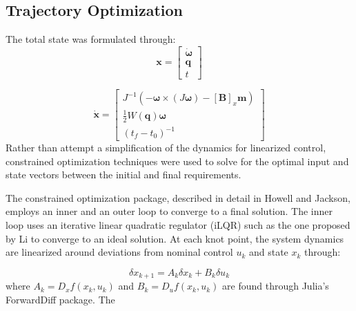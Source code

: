 \documentclass[letterpaper, preprint, paper,11pt]{IAA-AAS}	%
\begin{document}
\subsection{Trajectory Optimization}
The total state was formulated through:
\begin{equation}
	\label{eq:7}
	\mathbf{x} = 
	\begin{bmatrix}
	\mathbf{\dot{\omega}}\\
	\mathbf{q}\\
	t
	\end{bmatrix}
\end{equation}

\begin{equation}
	\label{eq:8}
	\mathbf{\dot{x}} = 
	\begin{bmatrix}
	J^{-1}(-\mathbf{\omega} \times (J\mathbf{\omega})-[\mathbf{B}]_x\mathbf{m})\\
	\frac{1}{2} W(\mathbf{q}) \mathbf{\omega}\\
	(t_f - t_0)^{-1}
	\end{bmatrix}
\end{equation}
Rather than attempt a simplification of the dynamics for linearized control, constrained optimization techniques were used to solve for the optimal input and state vectors between the initial and final requirements. 

The constrained optimization package, described in detail in Howell and Jackson\cite{howell2019}, employs an inner and an outer loop to converge to a final solution. The inner loop uses an iterative linear quadratic regulator (iLQR) such as the one proposed by Li\cite{li2004} to converge to an ideal solution. At each knot point, the system dynamics are linearized around deviations from nominal control $u_k$ and state $x_k$ through:

\begin{equation}
	\label{eq:9}
	\delta x_{k+1} = A_k \delta x_k + B_k \delta u_k
\end{equation}
where $A_k = D_x f(x_k,u_k)$ and $B_k = D_uf(x_k,u_k)$ are found through Julia’s ForwardDiff package. The 
\end{document}
